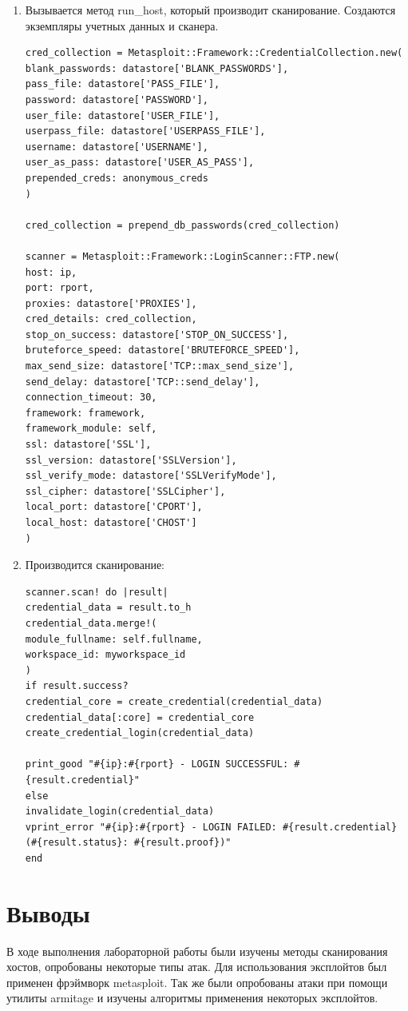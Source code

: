 \documentclass[10pt,a4paper]{report}
\begin{document}
		\begin{enumerate}
			\item Вызывается метод run\_host, который производит сканирование.
			Создаются экземпляры учетных данных и сканера.
			\begin{lstlisting}
cred_collection = Metasploit::Framework::CredentialCollection.new(
blank_passwords: datastore['BLANK_PASSWORDS'],
pass_file: datastore['PASS_FILE'],
password: datastore['PASSWORD'],
user_file: datastore['USER_FILE'],
userpass_file: datastore['USERPASS_FILE'],
username: datastore['USERNAME'],
user_as_pass: datastore['USER_AS_PASS'],
prepended_creds: anonymous_creds
)

cred_collection = prepend_db_passwords(cred_collection)

scanner = Metasploit::Framework::LoginScanner::FTP.new(
host: ip,
port: rport,
proxies: datastore['PROXIES'],
cred_details: cred_collection,
stop_on_success: datastore['STOP_ON_SUCCESS'],
bruteforce_speed: datastore['BRUTEFORCE_SPEED'],
max_send_size: datastore['TCP::max_send_size'],
send_delay: datastore['TCP::send_delay'],
connection_timeout: 30,
framework: framework,
framework_module: self,
ssl: datastore['SSL'],
ssl_version: datastore['SSLVersion'],
ssl_verify_mode: datastore['SSLVerifyMode'],
ssl_cipher: datastore['SSLCipher'],
local_port: datastore['CPORT'],
local_host: datastore['CHOST']
)
			\end{lstlisting}
			
			\item Производится сканирование:
			\begin{lstlisting}
scanner.scan! do |result|
credential_data = result.to_h
credential_data.merge!(
module_fullname: self.fullname,
workspace_id: myworkspace_id
)
if result.success?
credential_core = create_credential(credential_data)
credential_data[:core] = credential_core
create_credential_login(credential_data)

print_good "#{ip}:#{rport} - LOGIN SUCCESSFUL: #{result.credential}"
else
invalidate_login(credential_data)
vprint_error "#{ip}:#{rport} - LOGIN FAILED: #{result.credential} 
(#{result.status}: #{result.proof})"
end
			\end{lstlisting}
		\end{enumerate}
	
	\section{Выводы}
	В ходе выполнения лабораторной работы были изучены методы сканирования 
	хостов, опробованы некоторые типы атак.
	Для использования эксплойтов был применен фрэймворк metasploit.
	Так же были опробованы атаки при помощи утилиты armitage и изучены алгоритмы 
	применения некоторых эксплойтов.
\end{document}
